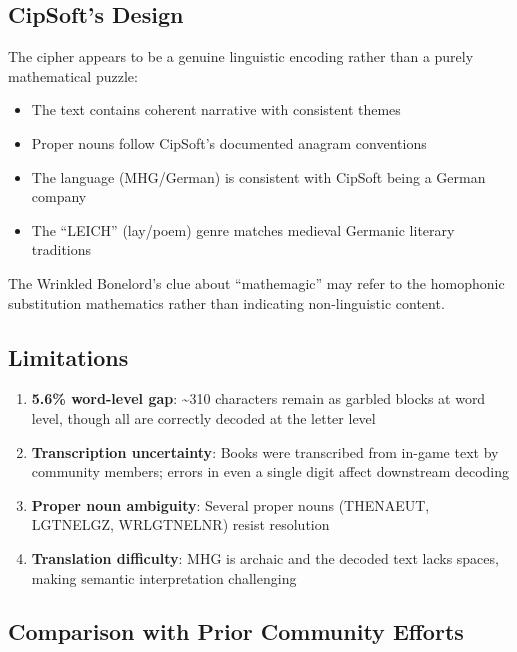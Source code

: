 \documentclass[11pt,a4paper]{article}
\begin{document}
\subsection{CipSoft's Design}

The cipher appears to be a genuine linguistic encoding rather than a purely mathematical puzzle:

\begin{itemize}
\item The text contains coherent narrative with consistent themes
\item Proper nouns follow CipSoft's documented anagram conventions
\item The language (MHG/German) is consistent with CipSoft being a German company
\item The ``LEICH'' (lay/poem) genre matches medieval Germanic literary traditions
\end{itemize}

The Wrinkled Bonelord's clue about ``mathemagic'' may refer to the homophonic substitution mathematics rather than indicating non-linguistic content.

\subsection{Limitations}

\begin{enumerate}
\item \textbf{5.6\% word-level gap}: \~{}310 characters remain as garbled blocks at word level, though all are correctly decoded at the letter level
\item \textbf{Transcription uncertainty}: Books were transcribed from in-game text by community members; errors in even a single digit affect downstream decoding
\item \textbf{Proper noun ambiguity}: Several proper nouns (THENAEUT, LGTNELGZ, WRLGTNELNR) resist resolution
\item \textbf{Translation difficulty}: MHG is archaic and the decoded text lacks spaces, making semantic interpretation challenging
\end{enumerate}

\subsection{Comparison with Prior Community Efforts}
\end{document}

